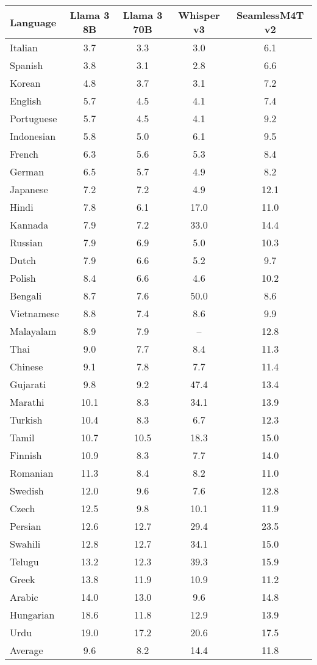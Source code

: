 \begin{NiceTabular}{lcccc}
	\CodeBefore
	\Body
	\toprule
	Language &  Llama 3 8B & Llama 3 70B & Whisper v3 & SeamlessM4T v2 \\
	\midrule
	Italian	&	3.7	&	3.3	&	3.0	&	6.1	\\
	Spanish	&	3.8	&	3.1	&	2.8	&	6.6	\\
	Korean	&	4.8	&	3.7	&	3.1	&	7.2	\\
	English	&	5.7	&	4.5	&	4.1	&	7.4	\\
	Portuguese	&	5.7	&	4.5	&	4.1	&	9.2	\\
	Indonesian	&	5.8	&	5.0	&	6.1	&	9.5	\\
	French	&	6.3	&	5.6	&	5.3	&	8.4	\\
	German	&	6.5	&	5.7	&	4.9	&	8.2	\\
	Japanese	&	7.2	&	7.2	&	4.9	&	12.1	\\
	Hindi	&	7.8	&	6.1	&	17.0	&	11.0	\\
	Kannada	&	7.9	&	7.2	&	33.0	&	14.4	\\
	Russian	&	7.9	&	6.9	&	5.0	&	10.3	\\
	Dutch	&	7.9	&	6.6	&	5.2	&	9.7	\\
	Polish	&	8.4	&	6.6	&	4.6	&	10.2	\\
	Bengali	&	8.7	&	7.6	&	50.0	&	8.6	\\
	Vietnamese	&	8.8	&	7.4	&	8.6	&	9.9	\\
	Malayalam	&	8.9	&	7.9	&	--	&	12.8	\\
	Thai	&	9.0	&	7.7	&	8.4	&	11.3	\\
	Chinese	&	9.1	&	7.8	&	7.7	&	11.4	\\
	Gujarati	&	9.8	&	9.2	&	47.4	&	13.4	\\
	Marathi	&	10.1	&	8.3	&	34.1	&	13.9	\\
	Turkish	&	10.4	&	8.3	&	6.7	&	12.3	\\
	Tamil	&	10.7	&	10.5	&	18.3	&	15.0	\\
	Finnish	&	10.9	&	8.3	&	7.7	&	14.0	\\
	Romanian	&	11.3	&	8.4	&	8.2	&	11.0	\\
	Swedish	&	12.0	&	9.6	&	7.6	&	12.8	\\
	Czech	&	12.5	&	9.8	&	10.1	&	11.9	\\
	Persian	&	12.6	&	12.7	&	29.4	&	23.5	\\
	Swahili	&	12.8	&	12.7	&	34.1	&	15.0	\\
	Telugu	&	13.2	&	12.3	&	39.3	&	15.9	\\
	Greek	&	13.8	&	11.9	&	10.9	&	11.2	\\
	Arabic	&	14.0	&	13.0	&	9.6	&	14.8	\\
	Hungarian	&	18.6	&	11.8	&	12.9	&	13.9	\\
	Urdu	&	19.0	&	17.2	&	20.6	&	17.5	\\
	\midrule
	Average &9.6 & 8.2 &	14.4	&	11.8	 \\
	\bottomrule
\end{NiceTabular}
